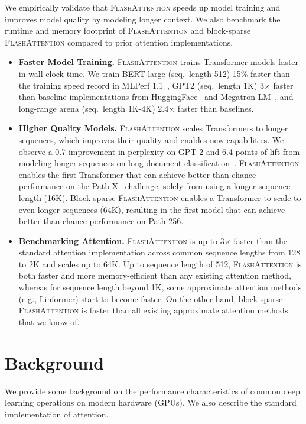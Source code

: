 \documentclass{article}
\newcommand{\sysname}{\textsc{FlashAttention}\xspace}
\begin{document}
We empirically validate that \sysname speeds up model training and improves model quality by modeling longer context. We also benchmark the runtime and memory footprint of \sysname and block-sparse \sysname compared to prior attention implementations.
\begin{itemize}[itemsep=0.1pt,topsep=0pt,leftmargin=*]
  \item \textbf{Faster Model Training.} \sysname trains Transformer models faster in wall-clock time. We train BERT-large (seq.\ length 512) 15\% faster than the training speed record in MLPerf 1.1~\citep{mattson2020mlperf}, GPT2 (seq.\ length 1K) 3$\times$ faster than baseline implementations from HuggingFace~\citep{wolf-etal-2020-transformers} and Megatron-LM~\citep{shoeybi2019megatron}, and long-range arena (seq.\ length 1K-4K) 2.4$\times$ faster than baselines.
  \item \textbf{Higher Quality Models.} \sysname scales Transformers to longer sequences, which improves their quality and enables new capabilities.
  We observe a 0.7 improvement in perplexity on GPT-2 and 6.4 points of lift from modeling longer sequences on long-document classification~\citep{dai2022revisiting}.
  \sysname enables the first Transformer that can achieve better-than-chance performance on the Path-X~\citep{tay2020long} challenge, solely from using a longer sequence length (16K).
  Block-sparse \sysname enables a Transformer to scale to even longer sequences (64K), resulting in the first model that can achieve better-than-chance performance on Path-256.
  \item \textbf{Benchmarking Attention.} \sysname is up to 3$\times$ faster than the standard attention implementation across common sequence lengths from 128 to 2K and scales up to 64K.
  Up to sequence length of 512, \sysname is both faster and more memory-efficient than any existing attention method, whereas for sequence length beyond 1K, some approximate attention methods (e.g., Linformer) start to become faster.
  On the other hand, block-sparse \sysname is faster than all existing approximate attention methods that we know of.
  
\end{itemize}

\section{Background}
\label{sec:background}

We provide some background on the performance characteristics of common deep
learning operations on modern hardware (GPUs).
We also describe the standard implementation of attention.
\end{document}
